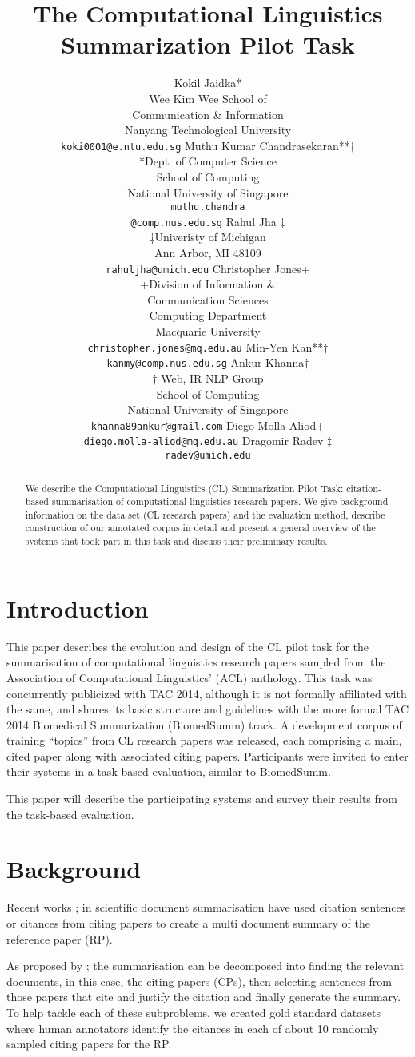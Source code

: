 \documentclass[11pt]{article}
\title{The Computational Linguistics Summarization Pilot Task}
\author{Kokil Jaidka* \\
  \small *Wee Kim Wee School of  \\
  \small Communication \& Information \\
  \small Nanyang Technological University \\
  \small {\tt koki0001@e.ntu.edu.sg} \And  
  Muthu Kumar Chandrasekaran**$\dagger$ \\
  \small **Dept. of Computer Science \\
  \small School of Computing \\
  \small National University of Singapore \\
  \small {\tt muthu.chandra}\\
  \small {\tt @comp.nus.edu.sg}  \And  
   Rahul Jha $\ddagger$ \\
  $\ddagger$\small Univeristy of Michigan \\
  \small Ann Arbor, MI 48109  \\
  \small {\tt rahuljha@umich.edu} \AND  
  Christopher Jones+ \\
  \small +Division of Information \& \\
  \small Communication Sciences \\
  \small Computing Department\\
  \small Macquarie University \\ 
  \small{\tt christopher.jones@mq.edu.au} \And
  Min-Yen Kan**$\dagger$ \\
  \small {\tt kanmy@comp.nus.edu.sg} \And  
  Ankur Khanna$\dagger$ \\
  \small $\dagger$ Web, IR \/ NLP Group \\
  \small School of Computing \\
  \small National University of Singapore \\
  \small {\tt khanna89ankur@gmail.com} \AND  
  Diego Molla-Aliod+ \\
  \small{\tt diego.molla-aliod@mq.edu.au} \And
  Dragomir Radev $\ddagger$ \\
  \small {\tt radev@umich.edu} \And  
 }
\date{}
\begin{document}
\maketitle
\begin{abstract}
We describe the Computational Linguistics (CL) Summarization Pilot 
Task: citation-based summarisation of computational 
linguistics research papers. We give background information on 
the data set (CL research papers) and the evaluation method, 
describe construction of our annotated corpus in detail and 
present a general overview of the systems that took part in 
this task and discuss their preliminary results.
\end{abstract}

\section{Introduction}
This paper describes the evolution and design of the CL pilot task for 
the summarisation of computational linguistics research papers sampled 
from the Association of Computational Linguistics' (ACL) anthology.
This task  was concurrently publicized with TAC 2014, although it is not 
formally affiliated with the same, and shares its basic structure and 
guidelines with the more formal TAC 2014 Biomedical Summarization 
(BiomedSumm) track. A development corpus of training ``topics'' from 
CL research papers was released, each comprising a main, cited paper along 
with associated citing papers. Participants were invited to enter their 
systems in a task-based evaluation, similar to BiomedSumm.

This paper will describe the participating systems and survey their 
results from the task-based evaluation.

\section{Background}
Recent works \cite{mohammad2009};\cite{abu2011} in scientific document 
summarisation have used citation sentences or citances from citing  papers 
to create a multi document summary of the reference paper (RP). 

As proposed by \cite{vu2010}; \cite{hoang2010} the summarisation can be 
decomposed into finding the relevant documents, in this case, the citing 
papers (CPs), then selecting sentences from those papers that cite and 
justify the citation and finally generate the summary. To help tackle each 
of these subproblems, we created gold standard datasets where human annotators 
identify the citances in each of about 10 randomly sampled citing papers for 
the RP.
\end{document}
